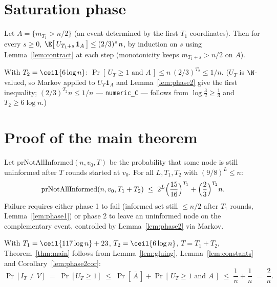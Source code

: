 \section{Saturation phase}\label{sec:saturation}

\begin{lemma}[Phase 2]\label{lem:phase2}
  \leanok
  Let $A = \{m_{T_1} > n/2\}$ (an event determined by the first $T_1$
  coordinates). Then for every $s \ge 0$,
  $\E\bigl[\, U_{T_1 + s}\, \mathbf{1}_A \,\bigr] \le (2/3)^{s}\, n$, by
  induction on $s$ using Lemma~\ref{lem:contract} at each step (monotonicity
  keeps $m_{T_1+s} > n/2$ on $A$).
\end{lemma}

\begin{corollary}\label{lem:phase2cor}
  \leanok
  With $T_2 = \ceil{6 \log n}$: $\Pr[\, U_T \ge 1 \text{ and } A \,]
    \le n\,(2/3)^{T_2} \le 1/n$. ($U_T$ is $\N$-valued, so Markov applied to
  $U_T \mathbf{1}_A$ and Lemma~\ref{lem:phase2} give the first inequality;
  $(2/3)^{T_2} n \le 1/n$ — \texttt{numeric\_C} — follows from
  $\log\tfrac32 \ge \tfrac13$ and $T_2 \ge 6\log n$.)
\end{corollary}

\section{Proof of the main theorem}\label{sec:proof-main}

\begin{lemma}\label{lem:gluing}
  \leanok
  Let $\mathrm{prNotAllInformed}(n,v_0,T)$ be the probability that some node
  is still uninformed after $T$ rounds started at $v_0$. For all
  $L, T_1, T_2$ with $(9/8)^L \le n$:
  \[
    \mathrm{prNotAllInformed}(n,v_0,T_1+T_2) \;\le\;
      2^{L}\Bigl(\frac{15}{16}\Bigr)^{T_1} + \Bigl(\frac23\Bigr)^{T_2} n.
  \]
  Failure requires either phase 1 to fail (informed set still $\le n/2$
  after $T_1$ rounds, Lemma~\ref{lem:phase1}) or phase 2 to leave an
  uninformed node on the complementary event, controlled by
  Lemma~\ref{lem:phase2} via Markov.
\end{lemma}

With $T_1 = \ceil{117\log n} + 23$, $T_2 = \ceil{6\log n}$, $T = T_1+T_2$,
Theorem~\ref{thm:main} follows from Lemma~\ref{lem:gluing},
Lemma~\ref{lem:constants} and Corollary~\ref{lem:phase2cor}:
\[
  \Pr[I_T \ne V] \;=\; \Pr[U_T \ge 1]
  \;\le\; \Pr[\,\overline{A}\,] + \Pr[\,U_T \ge 1 \text{ and } A\,]
  \;\le\; \frac1n + \frac1n \;=\; \frac2n .
\]

